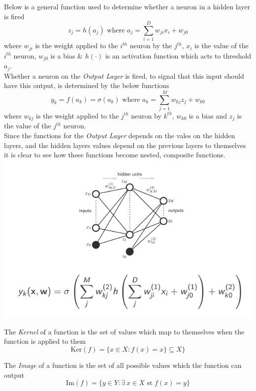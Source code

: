 \documentclass[11pt,a4paper]{article}
\begin{document}
Below is a general function used to determine whether a neuron in a hidden layer is fired
$$z_j=h(a_j)\text{ where }a_j=\sum_{i=1}^Dw_{ji}x_i+w_{j0}$$
where $w_{ji}$ is the weight applied to the $i^{th}$ neuron by the $j^{th}$, $x_i$ is the value of the $i^{th}$ neuron, $w_{j0}$ is a bias \& $h(\cdot)$ is an activation function which acts to threshold $a_j$.\\

Whether a neuron on the \textit{Output Layer} is fired, to signal that this input should have this output, is determined by the below functions
$$y_k=f(a_k)=\sigma(a_k)\text{ where }a_k=\sum_{j=1}^Mw_{kj}z_j+w_{k0}$$
where $w_{kj}$ is the weight applied to the $j^{th}$ neuron by $k^{th}$, $w_{k0}$ is a bias and $z_j$ is the value of the $j^{th}$ neuron.\\

Since the functions for the \textit{Output Layer} depends on the vales on the hidden layers, and the hidden layers values depend on the previous layers to themselves it is clear to see how these functions become nested, composite functions.\\
\includegraphics[scale=.8]{img/neuralNetworkFunction.png}

The \textit{Kernel} of a function is the set of values which map to themselves when the function is applied to them
$$\text{Ker}(f)=\{x\in X:f(x)=x\}\subseteq X\}$$

The \textit{Image} of a function is the set of all possible values which the function can output
$$\text{Im}(f)=\{y\in Y:\exists\ x\in X\text{ st }f(x)=y\}$$
\end{document}
